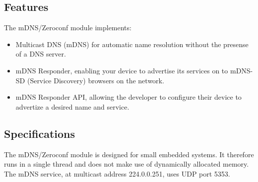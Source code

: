 \documentclass[11pt,titlepage]{article}
\begin{document}
\subsection{Features}

The mDNS/Zeroconf module implements:

\begin{itemize}
	\item Multicast DNS (mDNS) for automatic name resolution without the
		  presense of a DNS server.
	\item mDNS Responder, enabling your device to advertise its services on
		  to mDNS-SD (Service Discovery) browsers on the network.
	\item mDNS Responder API, allowing the developer to configure their device
		  to advertize a desired name and service.
\end{itemize}

\subsection{Specifications}

The mDNS/Zeroconf module is designed for small embedded systems.  It therefore
runs in a single thread and does not make use of dynamically allocated memory.
The mDNS service, at multicast address 224.0.0.251, uses UDP port 5353.
\end{document}
